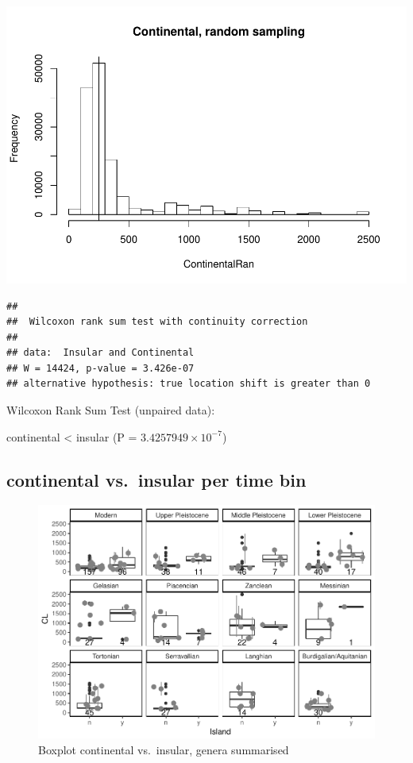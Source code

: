 \documentclass[]{article}
\begin{document}
\includegraphics{MA_JJ_files/figure-latex/RSCI-1.pdf}

\begin{verbatim}
## 
##  Wilcoxon rank sum test with continuity correction
## 
## data:  Insular and Continental
## W = 14424, p-value = 3.426e-07
## alternative hypothesis: true location shift is greater than 0
\end{verbatim}

Wilcoxon Rank Sum Test (unpaired data):

continental \textless{} insular (P = \(3.4257949\times 10^{-7}\))

\newpage

\subsection{continental vs.~insular per time
bin}\label{continental-vs.insular-per-time-bin-1}

\begin{figure}[htbp]
\centering
\includegraphics{MA_JJ_files/figure-latex/BPCIBins-1.pdf}
\caption{Boxplot continental vs.~insular, genera summarised}
\end{figure}
\end{document}
